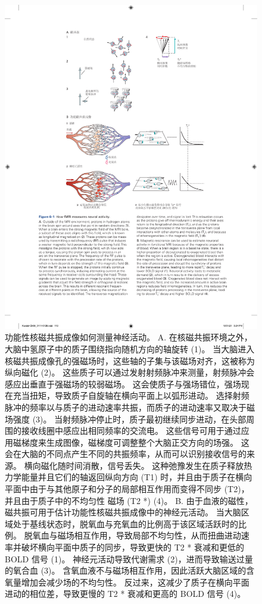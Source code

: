 \begin{figure}[htbp]
	\centering
	\includegraphics[width=0.9\linewidth]{chap06/fig_6_1}
	\caption{功能性核磁共振成像如何测量神经活动。 
		A. 在核磁共振环境之外，大脑中氢原子中的质子围绕指向随机方向的轴旋转 (1)。 
		当大脑进入核磁共振成像孔的强磁场时，这些轴的子集与该磁场对齐，这被称为纵向磁化 (2)。 
		这些质子可以通过发射射频脉冲来测量，射频脉冲会感应出垂直于强磁场的较弱磁场。
		这会使质子与强场错位，强场现在充当扭矩，导致质子自旋轴在横向平面上以弧形进动。 
		选择射频脉冲的频率以与质子的进动速率共振，而质子的进动速率又取决于磁场强度 (3)。 
		当射频脉冲停止时，质子最初继续同步进动，在头部周围的接收线圈中感应出相同频率的交流电。 
		这些信号可用于通过应用磁梯度来生成图像，磁梯度可调整整个大脑正交方向的场强。 
		这会在大脑的不同点产生不同的共振频率，从而可以识别接收信号的来源。 
		横向磁化随时间消散，信号丢失。 
		这种弛豫发生在质子释放热力学能量并且它们的轴返回纵向方向 (T1) 时，并且由于质子在横向平面中由于与其他原子和分子的局部相互作用而变得不同步 (T2)，并且由于质子中的不均匀性 磁场 (T2 *) (4)。 
		B. 由于血液的磁性，磁共振可用于估计功能性核磁共振成像中的神经元活动。 
		当大脑区域处于基线状态时，脱氧血与充氧血的比例高于该区域活跃时的比例。 
		脱氧血与磁场相互作用，导致局部不均匀性，从而扭曲进动速率并破坏横向平面中质子的同步，导致更快的 T2 * 衰减和更低的 BOLD 信号 (1)。
		神经元活动导致代谢需求 (2)，进而导致输送过量的氧合血 (3)。
		含氧血液不与磁场相互作用，因此活跃大脑区域的含氧量增加会减少场的不均匀性。
		反过来，这减少了质子在横向平面进动的相位差，导致更慢的 T2 * 衰减和更高的 BOLD 信号 (4)。}
	\label{fig:6_1}
\end{figure}



